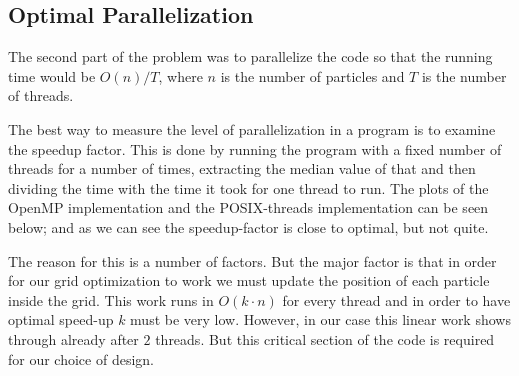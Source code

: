 \subsection{Optimal Parallelization}

The second part of the problem was to parallelize the code so that the running
time would be $O(n) / T$, where $n$ is the number of particles and $T$ is the
number of threads.

The best way to measure the level of parallelization in a program is to examine
the speedup factor. This is done by running the program with a fixed number of
threads for a number of times, extracting the median value of that and then
dividing the time with the time it took for one thread to run. The plots of the
OpenMP implementation and the POSIX-threads implementation can be seen below;
and as we can see the speedup-factor is close to optimal, but not quite.

The reason for this is a number of factors. But the major factor is that in
order for our grid optimization to work we must update the position of each
particle inside the grid. This work runs in $O(k \cdot n)$ for every thread and
in order to have optimal speed-up $k$ must be very low. However, in our case
this linear work shows through already after $2$ threads. But this critical
section of the code is required for our choice of design.


